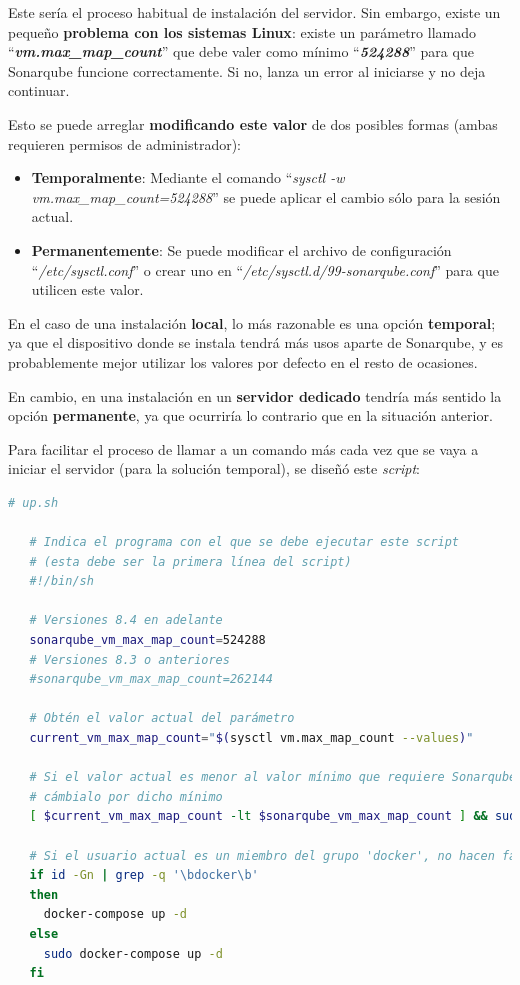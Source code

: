 \documentclass[11pt,spanish,listoffigures,listoftables,table,hyphens,dvipsnames]{tfgetsinf}
\begin{document}
Este sería el proceso habitual de instalación del servidor. Sin embargo, existe un pequeño \textbf{problema con los sistemas Linux}: existe un parámetro llamado ``\textbf{\emph{vm.max\_map\_count}}'' que debe valer como mínimo ``\textbf{\emph{524288}}'' para que Sonarqube funcione correctamente. Si no, lanza un error al iniciarse y no deja continuar.

Esto se puede arreglar \textbf{modificando este valor} de dos posibles formas (ambas requieren permisos de administrador):
\begin{itemize}
   \item \textbf{Temporalmente}: Mediante el comando ``\emph{sysctl -w vm.max\_map\_count=524288}'' se puede aplicar el cambio sólo para la sesión actual.
   \item \textbf{Permanentemente}: Se puede modificar el archivo de configuración ``\emph{/etc/sysctl.conf}'' o crear uno en ``\emph{/etc/sysctl.d/99-sonarqube.conf}'' para que utilicen este valor.
\end{itemize}

En el caso de una instalación \textbf{local}, lo más razonable es una opción \textbf{temporal}; ya que el dispositivo donde se instala tendrá más usos aparte de Sonarqube, y es probablemente mejor utilizar los valores por defecto en el resto de ocasiones.

En cambio, en una instalación en un \textbf{servidor dedicado} tendría más sentido la opción \textbf{permanente}, ya que ocurriría lo contrario que en la situación anterior.

Para facilitar el proceso de llamar a un comando más cada vez que se vaya a iniciar el servidor (para la solución temporal), se diseñó este \emph{script}:

\begin{lstlisting}[language=sh]
   # up.sh

   # Indica el programa con el que se debe ejecutar este script
   # (esta debe ser la primera línea del script)
   #!/bin/sh

   # Versiones 8.4 en adelante
   sonarqube_vm_max_map_count=524288
   # Versiones 8.3 o anteriores
   #sonarqube_vm_max_map_count=262144

   # Obtén el valor actual del parámetro
   current_vm_max_map_count="$(sysctl vm.max_map_count --values)"
  
   # Si el valor actual es menor al valor mínimo que requiere Sonarqube,
   # cámbialo por dicho mínimo
   [ $current_vm_max_map_count -lt $sonarqube_vm_max_map_count ] && sudo sysctl -w vm.max_map_count=$sonarqube_vm_max_map_count
   
   # Si el usuario actual es un miembro del grupo 'docker', no hacen falta permisos de administrador (obtenidos mediante el comando 'sudo')
   if id -Gn | grep -q '\bdocker\b'
   then
     docker-compose up -d
   else
     sudo docker-compose up -d
   fi    
\end{lstlisting}
\end{document}
